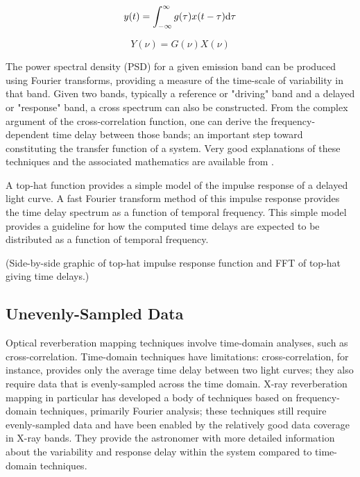\documentclass[11pt,letterpaper]{article}
\begin{document}
	\begin{equation}
		\label{time_transfunc}
		y(t) = \int_{-\infty}^{\infty} g(\tau) x(t-\tau)  {\rm d}\tau
	\end{equation}

	\begin{equation}
		\label{freq_transfunc}
		Y(\nu) = G(\nu) X(\nu)
	\end{equation}



	The power spectral density (PSD) for a given emission band can be produced using Fourier transforms, providing a measure of the time-scale of variability in that band. Given two bands, typically a reference or "driving" band and a delayed or "response" band, a cross spectrum can also be constructed. From the complex argument of the cross-correlation function, one can derive the frequency-dependent time delay between those bands; an important step toward constituting the transfer function of a system. Very good explanations of these techniques and the associated mathematics are available from \cite{2014A&ARv..22...72U}.

	A top-hat function provides a simple model of the impulse response of a delayed light curve. A fast Fourier transform method of this impulse response provides the time delay spectrum as a function of temporal frequency. This simple model provides a guideline for how the computed time delays are expected to be distributed as a function of temporal frequency.

	(Side-by-side graphic of top-hat impulse response function and FFT of top-hat giving time delays.)

	\subsection{Unevenly-Sampled Data}


	Optical reverberation mapping techniques involve time-domain analyses, such as cross-correlation. Time-domain techniques have limitations: cross-correlation, for instance, provides only the average time delay between two light curves; they also require data that is evenly-sampled across the time domain. X-ray reverberation mapping in particular has developed a body of techniques based on frequency-domain techniques, primarily Fourier analysis; these techniques still require evenly-sampled data and have been enabled by the relatively good data coverage in X-ray bands. They provide the astronomer with more detailed information about the variability and response delay within the system compared to time-domain techniques.
\end{document}
